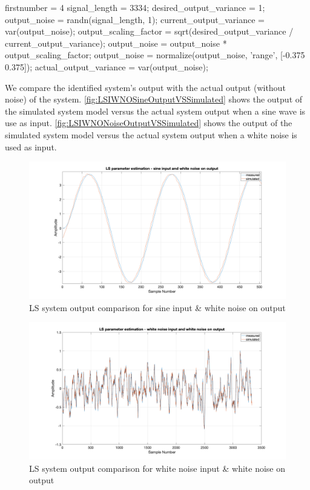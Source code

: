 \begin{code}
	\begin{matlabcode}{firstnumber = 4}
signal_length = 3334; 
desired_output_variance = 1; 
output_noise = randn(signal_length, 1);
current_output_variance = var(output_noise);
output_scaling_factor = sqrt(desired_output_variance / current_output_variance);
output_noise = output_noise * output_scaling_factor;
output_noise = normalize(output_noise, 'range', [-0.375 0.375]);
actual_output_variance = var(output_noise);
	\end{matlabcode}
	\label{code:LSIWNOOutputNoiseGeneration}
\end{code}

We compare the identified system's output with the actual output (without noise) of the system. \autoref{fig:LSIWNOSineOutputVSSimulated} shows the output of the simulated system model versus the actual system output when a sine wave is use as input. \autoref{fig:LSIWNONoiseOutputVSSimulated} shows the output of the simulated system model versus the actual system output when a white noise is used as input.

\begin{figure}
	\centering
	\includegraphics[totalheight=8cm]{images/LSIWNOSineOutputVSSimulated.png}
	\caption{LS system output comparison for sine input \& white noise on output}
	\label{fig:LSIWNOSineOutputVSSimulated}
\end{figure}
\begin{figure}
	\centering
	\includegraphics[totalheight=8cm]{images/LSIWNONoiseOutputVSSimulated.png}
	\caption{LS system output comparison for white noise input \& white noise on output}
	\label{fig:LSIWNONoiseOutputVSSimulated}
\end{figure}

